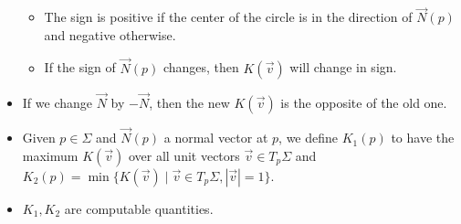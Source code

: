 \documentclass[../main.tex]{subfiles}
\begin{document}
\begin{itemize}
    \begin{itemize}
        \item The sign is positive if the center of the circle is in the direction of $\vec{N}(p)$ and negative otherwise.
        \item If the sign of $\vec{N}(p)$ changes, then $K(\vec{v})$ will change in sign.
    \end{itemize}
    \item If we change $\vec{N}$ by $-\vec{N}$, then the new $K(\vec{v})$ is the opposite of the old one.
    \item Given $p\in\Sigma$ and $\vec{N}(p)$ a normal vector at $p$, we define $K_1(p)$ to have the maximum $K(\vec{v})$ over all unit vectors $\vec{v}\in T_p\Sigma$ and $K_2(p)=\min\{K(\vec{v})\mid \vec{v}\in T_p\Sigma,|\vec{v}|=1\}$.
    \item $K_1,K_2$ are computable quantities.
\end{itemize}
\end{document}
